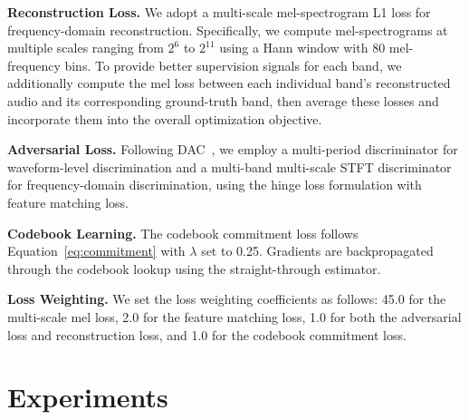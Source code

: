 \documentclass[11pt]{article}
\begin{document}
\noindent\textbf{Reconstruction Loss.} We adopt a multi-scale mel-spectrogram L1 loss for frequency-domain reconstruction. Specifically, we compute mel-spectrograms at multiple scales ranging from $2^6$ to $2^{11}$ using a Hann window with 80 mel-frequency bins. To provide better supervision signals for each band, we additionally compute the mel loss between each individual band's reconstructed audio and its corresponding ground-truth band, then average these losses and incorporate them into the overall optimization objective.

\noindent\textbf{Adversarial Loss.} Following DAC~\cite{kumar2023high}, we employ a multi-period discriminator for waveform-level discrimination and a multi-band multi-scale STFT discriminator for frequency-domain discrimination, using the hinge loss formulation with feature matching loss.

\noindent\textbf{Codebook Learning.} The codebook commitment loss follows Equation~\eqref{eq:commitment} with $\lambda$ set to 0.25. Gradients are backpropagated through the codebook lookup using the straight-through estimator.

\noindent\textbf{Loss Weighting.} We set the loss weighting coefficients as follows: 45.0 for the multi-scale mel loss, 2.0 for the feature matching loss, 1.0 for both the adversarial loss and reconstruction loss, and 1.0 for the codebook commitment loss.







\section{Experiments}
\label{sec:exp}
\end{document}
